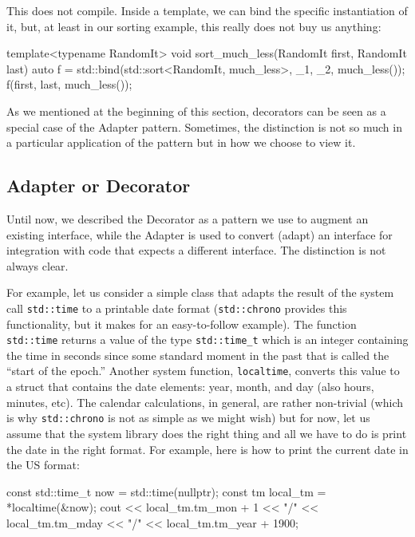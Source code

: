 This does not compile. Inside a template, we can bind the specific instantiation of it, but, at least in our sorting example, this really does not buy us anything:

\begin{code}
template<typename RandomIt>
void sort_much_less(RandomIt first, RandomIt last) {
  auto f = std::bind(std::sort<RandomIt, much_less>,
                     _1, _2, much_less());
  f(first, last, much_less());
}
\end{code}

As we mentioned at the beginning of this section, decorators can be seen as a special case of the Adapter pattern. Sometimes, the distinction is not so much in a particular application of the pattern but in how we choose to view it.

\subsection{Adapter or Decorator}

Until now, we described the Decorator as a pattern we use to augment an existing interface, while the Adapter is used to convert (adapt) an interface for integration with code that expects a different interface. The distinction is not always clear.

For example, let us consider a simple class that adapts the result of the system call \texttt{std::time} to a printable date format (\texttt{std::chrono} provides this functionality, but it makes for an easy-to-follow example). The function \texttt{std::time} returns a value of the type \texttt{std::time\_t} which is an integer containing the time in seconds since some standard moment in the past that is called the ``start of the epoch.'' Another system function, \texttt{localtime}, converts this value to a struct that contains the date elements: year, month, and day (also hours, minutes, etc). The calendar calculations, in general, are rather non-trivial (which is why \texttt{std::chrono} is not as simple as we might wish) but for now, let us assume that the system library does the right thing and all we have to do is print the date in the right format. For example, here is how to print the current date in the US format:

\begin{code}
const std::time_t now = std::time(nullptr);
const tm local_tm = *localtime(&now);
cout << local_tm.tm_mon + 1 << "/" <<
        local_tm.tm_mday << "/" <<
        local_tm.tm_year + 1900;
\end{code}

